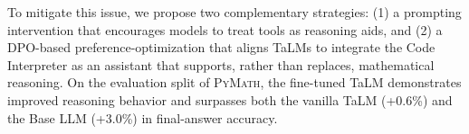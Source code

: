\documentclass[11pt]{article}
\def \dataset{\textsc{PyMath}\xspace}
\def \task{\textsc{TIM}\xspace}
\begin{document}
To mitigate this issue, we propose two complementary strategies: (1) a prompting intervention that encourages models to treat tools as reasoning aids, and (2) a DPO-based \citep{10.5555/3666122.3668460} preference-optimization that aligns TaLMs to integrate the Code Interpreter as an assistant that supports, rather than replaces, mathematical reasoning. 
On the evaluation split of \dataset, the fine-tuned TaLM demonstrates improved reasoning behavior and surpasses both the vanilla TaLM (+0.6\%) and the Base LLM (+3.0\%) in final-answer accuracy.
% 
% 
\end{document}
